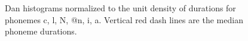 \begin{figure}[ht!]
    \hfill
  
    \caption[]{Dan histograms normalized to the unit density of durations for phonemes c, l, N, @n, i, a. Vertical red dash lines are the median phoneme durations.}
    \label{fig:ch4:dan_histo_phoneme}
\end{figure}

